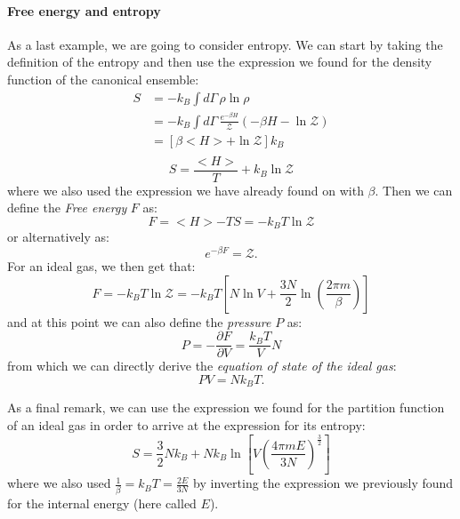 \paragraph*{Free energy and entropy}
As a last example, we are going to consider entropy. We can start by taking the definition of the entropy and then use the expression we found for the density function of the canonical ensemble:
\begin{equation*}
    \begin{split}
        S & = -k_B \int d\Gamma\, \rho\ln{\rho} \\
        & = -k_B \int d\Gamma\, \frac{e^{-\beta H}}{\mathcal{Z}}(-\beta H-\ln{\mathcal{Z}}) \\
        & = \left[\beta <H> +\ln{\mathcal{Z}}\right]k_B \\
    \end{split}
\end{equation*}
\begin{equation}
    S = \frac{<H>}{T}+k_B\ln{\mathcal{Z}}
\end{equation}
where we also used the expression we have already found on with $\beta$. Then we can define the \textit{Free energy} $F$ as:
\begin{equation}
    F= <H>-TS=-k_B T \ln{\mathcal{Z}}
\end{equation}
or alternatively as:
\begin{equation}
    e^{-\beta F}=\mathcal{Z}.
\end{equation}
For an ideal gas, we then get that:
\begin{equation}
    F=-k_B T \ln{\mathcal{Z}}=-k_B T \left[N\ln{V}+\frac{3N}{2}\ln{\left(\frac{2\pi m}{\beta} \right)}\right]
\end{equation}
and at this point we can also define the \textit{pressure} $P$ as:
\begin{equation}
    P=-\frac{\partial F}{\partial V}=\frac{k_B T}{V} N
\end{equation}
from which we can directly derive the \textit{equation of state of the ideal gas}:
\begin{equation}
    PV=N k_B T .
\end{equation}

As a final remark, we can use the expression we found for the partition function of an ideal gas in order to arrive at the expression for its entropy:
\begin{equation}
    S=\frac{3}{2}N k_B + N k_B \ln{\left[V\left(\frac{4\pi m E}{3N} \right)^{\frac{3}{2}} \right]}
\end{equation}
where we also used $\frac{1}{\beta}= k_B T= \frac{2E}{3N}$ by inverting the expression we previously found for the internal energy (here called $E$).

